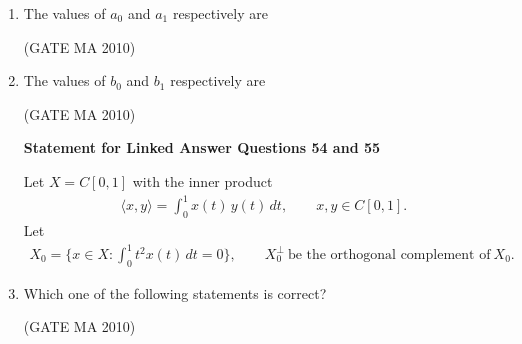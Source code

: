 \documentclass[journal,12pt,onecolumn]{IEEEtran}
\theoremstyle{remark}
\begin{document}
\begin{flushleft}
\begin{enumerate}
\item The values of $a_{0}$ and $a_{1}$ respectively are

\hfill(GATE MA 2010)

\begin{enumerate}
\end{enumerate}

\item The values of $b_{0}$ and $b_{1}$ respectively are

\hfill(GATE MA 2010)

\begin{enumerate}
\end{enumerate}

\textbf{Statement for Linked Answer Questions 54 and 55}

Let $X=C[0,1]$ with the inner product
\begin{align*}
\langle x,y\rangle=\int_{0}^{1} x(t)\,y(t)\,dt,\qquad x,y\in C[0,1].
\end{align*}
Let
\begin{align*}
X_{0}=\Big\{x\in X:\int_{0}^{1} t^{2}x(t)\,dt=0\Big\},\qquad
X_{0}^{\perp}\ \text{be the orthogonal complement of}\ X_{0}.
\end{align*}

\item Which one of the following statements is correct?

\hfill(GATE MA 2010)

\begin{enumerate}
\end{enumerate}


\end{enumerate}
\end{flushleft}
\end{document}
